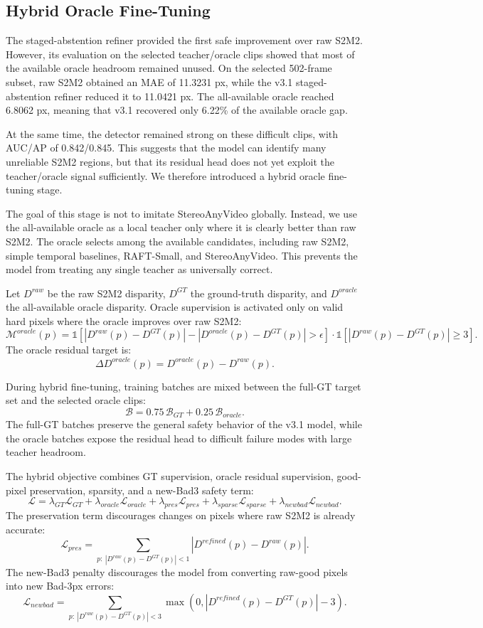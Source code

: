 \documentclass[11pt,a4paper]{article}
\begin{document}
\subsection{Hybrid Oracle Fine-Tuning}

The staged-abstention refiner provided the first safe improvement over raw S2M2.
However, its evaluation on the selected teacher/oracle clips showed that most of
the available oracle headroom remained unused. On the selected 502-frame subset,
raw S2M2 obtained an MAE of 11.3231 px, while the v3.1 staged-abstention refiner
reduced it to 11.0421 px. The all-available oracle reached 6.8062 px, meaning
that v3.1 recovered only 6.22\% of the available oracle gap.

At the same time, the detector remained strong on these difficult clips, with
AUC/AP of 0.842/0.845. This suggests that the model can identify many unreliable
S2M2 regions, but that its residual head does not yet exploit the teacher/oracle
signal sufficiently. We therefore introduced a hybrid oracle fine-tuning stage.

The goal of this stage is not to imitate StereoAnyVideo globally. Instead, we use
the all-available oracle as a local teacher only where it is clearly better than
raw S2M2. The oracle selects among the available candidates, including raw S2M2,
simple temporal baselines, RAFT-Small, and StereoAnyVideo. This prevents the
model from treating any single teacher as universally correct.

Let \(D^{raw}\) be the raw S2M2 disparity, \(D^{GT}\) the ground-truth disparity,
and \(D^{oracle}\) the all-available oracle disparity. Oracle supervision is
activated only on valid hard pixels where the oracle improves over raw S2M2:
\[
\mathcal{M}^{oracle}(p)
=
\mathbb{1}
\left[
|D^{raw}(p)-D^{GT}(p)|
-
|D^{oracle}(p)-D^{GT}(p)|
>
\epsilon
\right]
\cdot
\mathbb{1}
\left[
|D^{raw}(p)-D^{GT}(p)| \geq 3
\right].
\]
The oracle residual target is:
\[
\Delta D^{oracle}(p)
=
D^{oracle}(p) - D^{raw}(p).
\]

During hybrid fine-tuning, training batches are mixed between the full-GT target
set and the selected oracle clips:
\[
\mathcal{B}
=
0.75 \, \mathcal{B}_{GT}
+
0.25 \, \mathcal{B}_{oracle}.
\]
The full-GT batches preserve the general safety behavior of the v3.1 model,
while the oracle batches expose the residual head to difficult failure modes with
large teacher headroom.

The hybrid objective combines GT supervision, oracle residual supervision,
good-pixel preservation, sparsity, and a new-Bad3 safety term:
\[
\mathcal{L}
=
\lambda_{GT}\mathcal{L}_{GT}
+
\lambda_{oracle}\mathcal{L}_{oracle}
+
\lambda_{pres}\mathcal{L}_{pres}
+
\lambda_{sparse}\mathcal{L}_{sparse}
+
\lambda_{newbad}\mathcal{L}_{newbad}.
\]
The preservation term discourages changes on pixels where raw S2M2 is already
accurate:
\[
\mathcal{L}_{pres}
=
\sum_{p:\ |D^{raw}(p)-D^{GT}(p)| < 1}
\left|
D^{refined}(p) - D^{raw}(p)
\right|.
\]
The new-Bad3 penalty discourages the model from converting raw-good pixels into
new Bad-3px errors:
\[
\mathcal{L}_{newbad}
=
\sum_{p:\ |D^{raw}(p)-D^{GT}(p)| < 3}
\max
\left(
0,
|D^{refined}(p)-D^{GT}(p)| - 3
\right).
\]
\end{document}
